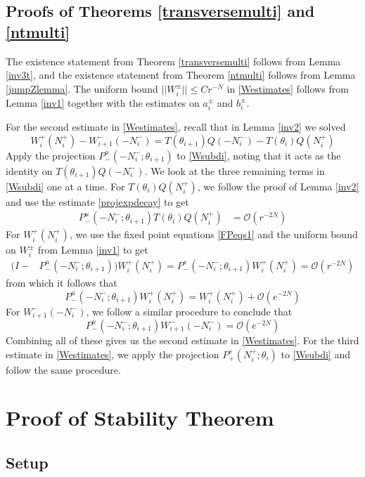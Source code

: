 \documentclass[12pt]{article}
\begin{document}
\subsection{Proofs of Theorems \ref{transversemulti} and \ref{ntmulti}}
The existence statement from Theorem \ref{transversemulti} follows from Lemma \ref{inv3t}, and the existence statement from Theorem \ref{ntmulti} follows from Lemma \ref{jumpZlemma}. The uniform bound $||W_i^\pm|| \leq C r^{-N}$ in \eqref{Westimates} follows from Lemma \ref{inv1} together with the estimates on $a_i^\pm$ and $b_i^\pm$. 

For the second estimate in \eqref{Westimates}, recall that in Lemma \ref{inv2} we solved
\begin{equation}\label{Wsubdi}
W_i^+(N_i^+) - W_{i+1}^-(-N_i^-) = T(\theta_{i+1}) Q(-N_i^-) - T(\theta_i) Q(N_i^+)
\end{equation}
Apply the projection $P^u_-(-N_i^-; \theta_{i+1})$ to \eqref{Wsubdi}, noting that it acts as the identity on $T(\theta_{i+1}) Q(-N_i^-)$. We look at the three remaining terms in \eqref{Wsubdi} one at a time. For $T(\theta_i) Q(N_i^+)$, we follow the proof of Lemma \ref{inv2} and use the estimate \ref{projexpdecay} to get
\begin{align*}
P^u_-(-N_i^-; \theta_{i+1})T(\theta_i) Q(N_i^+)
&= \mathcal{O}(r^{-2N})
\end{align*}
For $W_i^+(N_i^+)$, we use the fixed point equations \eqref{FPeqs1} and the uniform bound on $W_i^\pm$ from Lemma \ref{inv1} to get
\begin{align*}
(I - &P^u_-(-N_i^-; \theta_{i+1})) W_i^+(N_i^+) = P^s_-(-N_i^-; \theta_{i+1}) W_i^+(N_i^+) = \mathcal{O}(r^{-2N})
\end{align*}
from which it follows that
\[
P^u_-(-N_i^-; \theta_{i+1}) W_i^+(N_i^+) = W_i^+(N_i^+) + \mathcal{O}(e^{-2N})
\]
For $W_{i+1}^-(-N_i^-)$, we follow a similar procedure to conclude that
\[
P^u_-(-N_i^-; \theta_{i+1}) W_{i+1}^-(-N_i^-) = \mathcal{O}(e^{-2N})
\]
Combining all of these gives us the second estimate in \eqref{Westimates}. For the third estimate in \eqref{Westimates}, we apply the projection $P^s_+(N_i^+; \theta_i)$ to \eqref{Wsubdi} and follow the same procedure.

\section{Proof of Stability Theorem}

\subsection{Setup}
\end{document}
